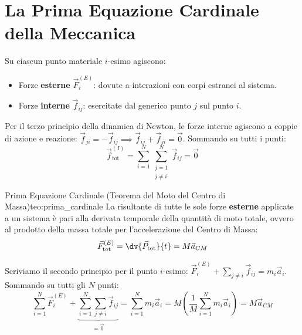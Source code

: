 \section{La Prima Equazione Cardinale della Meccanica}
\label{sec:prima_cardinale}

Su ciascun punto materiale $i$-esimo agiscono:
\begin{itemize}
    \item Forze \textbf{esterne} $\vec{F}_i^{(E)}$: dovute a interazioni con corpi estranei al sistema.
    \item Forze \textbf{interne} $\vec{f}_{ij}$: esercitate dal generico punto $j$ sul punto $i$.
\end{itemize}
Per il terzo principio della dinamica di Newton, le forze interne agiscono a coppie di azione e reazione: $\vec{f}_{ji} = -\vec{f}_{ij} \implies \vec{f}_{ij} + \vec{f}_{ji} = \vec{0}$. Sommando su tutti i punti:
\begin{equation}
    \vec{f}_{\text{tot}}^{(I)} = \sum_{i=1}^N \sum_{\substack{j=1 \\ j \neq i}}^N \vec{f}_{ij} = \vec{0}
    \label{eq:risultante_interna_nulla}
\end{equation}

\begin{teorema}{Prima Equazione Cardinale (Teorema del Moto del Centro di Massa)}{teo:prima_cardinale}
La risultante di tutte le sole forze \textbf{esterne} applicate a un sistema è pari alla derivata temporale della quantità di moto totale, ovvero al prodotto della massa totale per l'accelerazione del Centro di Massa:
\begin{equation}
    \vec{F}_{\text{tot}}^{(E)} = \dv{\vec{P}_{\text{tot}}}{t} = M\vec{a}_{CM}
    \label{eq:prima_cardinale}
\end{equation}
\end{teorema}

\begin{dimostrazione}
Scriviamo il secondo principio per il punto $i$-esimo: $\vec{F}_i^{(E)} + \sum_{j \neq i} \vec{f}_{ij} = m_i \vec{a}_i$. Sommando su tutti gli $N$ punti:
\begin{equation}
    \sum_{i=1}^N \vec{F}_i^{(E)} + \underbrace{\sum_{i=1}^N \sum_{j \neq i} \vec{f}_{ij}}_{=\vec{0}} = \sum_{i=1}^N m_i \vec{a}_i = M \left(\frac{1}{M}\sum_{i=1}^N m_i \vec{a}_i\right) = M\vec{a}_{CM}
\end{equation}
\end{dimostrazione}

